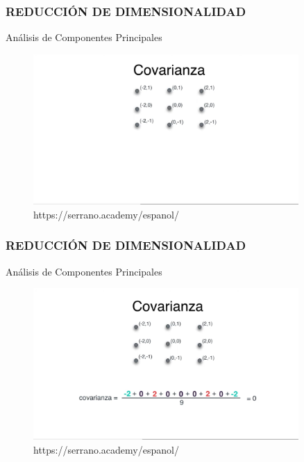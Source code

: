 \documentclass{beamer}
\begin{document}
\begin{frame}
	\frametitle{REDUCCIÓN DE DIMENSIONALIDAD}
	\begin{block}{Análisis de Componentes Principales}	
		\begin{figure}
			\includegraphics[width=0.9\textwidth]{PCA/IMG_3558.jpg}
			\caption{https://serrano.academy/espanol/}
		\end{figure}
	\end{block}
\end{frame}

\begin{frame}
	\frametitle{REDUCCIÓN DE DIMENSIONALIDAD}
	\begin{block}{Análisis de Componentes Principales}	
		\begin{figure}
			\includegraphics[width=0.9\textwidth]{PCA/IMG_3559.jpg}
			\caption{https://serrano.academy/espanol/}
		\end{figure}
	\end{block}
\end{frame}
\end{document}
